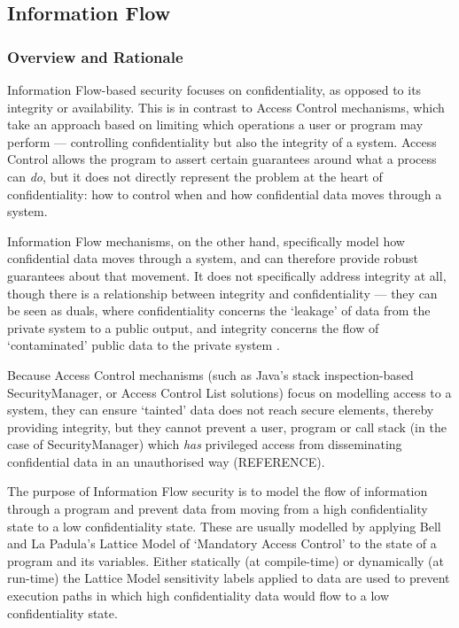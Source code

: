 \subsection{Information Flow}

\subsubsection{Overview and Rationale}

Information Flow-based security focuses on confidentiality, as opposed to its integrity or availability. This is in contrast to Access Control mechanisms, which take an approach based on limiting which operations a user or program may perform --- controlling confidentiality but also the integrity of a system. Access Control allows the program to assert certain guarantees around what a process can \textit{do}, but it does not directly represent the problem at the heart of confidentiality: how to control when and how confidential data moves through a system.

Information Flow mechanisms, on the other hand, specifically model how confidential data moves through a system, and can therefore provide robust guarantees about that movement. It does not specifically address integrity at all, though there is a relationship between integrity and confidentiality --- they can be seen as duals, where confidentiality concerns the `leakage' of data from the private system to a public output, and integrity concerns the flow of `contaminated' public data to the private system \cite{biba1977integrity} \cite{clarkson2010confintegrity}.

Because Access Control mechanisms (such as Java's stack inspection-based SecurityManager, or Access Control List solutions) focus on modelling access to a system, they can ensure `tainted' data does not reach secure elements, thereby providing integrity, but they cannot prevent a user, program or call stack (in the case of SecurityManager) which \textit{has} privileged access from disseminating confidential data in an unauthorised way (REFERENCE).

The purpose of Information Flow security is to model the flow of information through a program and prevent data from moving from a high confidentiality state to a low confidentiality state. These are usually modelled by applying Bell and La Padula's Lattice Model \cite{bell1976lattice} of `Mandatory Access Control' to the state of a program and its variables. Either statically (at compile-time) or dynamically (at run-time) the Lattice Model sensitivity labels applied to data are used to prevent execution paths in which high confidentiality data would flow to a low confidentiality state.


